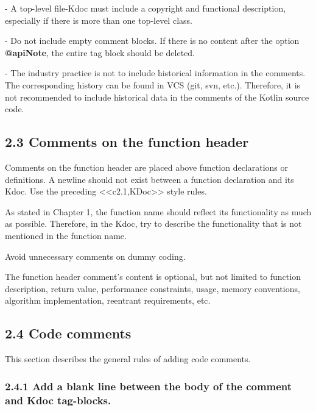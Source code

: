 {{{{{{{{{{{{{{{{- A top-level file-Kdoc must include a copyright and functional description, especially if there is more than one top-level class.

- Do not include empty comment blocks. If there is no content after the option \textbf{@apiNote}, the entire tag block should be deleted.

- The industry practice is not to include historical information in the comments. The corresponding history can be found in VCS (git, svn, etc.). Therefore, it is not recommended to include historical data in the comments of the Kotlin source code.



\subsection*{\textbf{2.3 Comments on the function header}}

\label{sec:2.3}



Comments on the function header are placed above function declarations or definitions. A newline should not exist between a function declaration and its Kdoc. Use the preceding <<c2.1,KDoc>> style rules.



As stated in Chapter 1, the function name should reflect its functionality as much as possible. Therefore, in the Kdoc, try to describe the functionality that is not mentioned in the function name.

Avoid unnecessary comments on dummy coding.



The function header comment's content is optional, but not limited to function description, return value, performance constraints, usage, memory conventions, algorithm implementation, reentrant requirements, etc.



\subsection*{\textbf{2.4 Code comments}}

\label{sec:2.4}



This section describes the general rules of adding code comments.



\subsubsection*{\textbf{2.4.1 Add a blank line between the body of the comment and Kdoc tag-blocks.}}
\leavevmode\newline

}}}}}}}}}}}}}}}}
